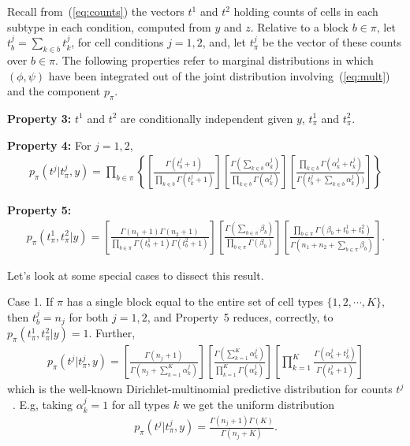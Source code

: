 \documentclass[aoas,preprint]{imsart}
\begin{document}
Recall from~(\ref{eq:counts}) the vectors $t^1$ and $t^2$ holding
counts  of cells in each subtype in each condition, computed from $y$ and $z$.  Relative to a block $b \in \pi$, 
let $t^j_b = \sum_{k\in b} t^j_k$, for cell conditions $j=1,2$, and,
let $t^j_\pi$ be the vector of these counts over $b \in \pi$.   The following properties refer to
marginal distributions in which $(\phi,\psi)$ have been integrated out of the joint
distribution involving~(\ref{eq:mult}) and the component $p_\pi$.

\noindent
{\bf Property 3:}  $t^1$ and $t^2$ are conditionally independent given $y$, $t^1_\pi$ and $t^2_\pi$.

\noindent
{\bf Property 4:}  For $j=1,2$,
\begin{eqnarray*}
p_\pi(t^j | t^j_{\pi},y) = \prod_{b \in \pi} \left\{
\left[ \frac{ \Gamma(t^j_b +1 ) }{\prod_{k \in b} \Gamma( t^j_k + 1 ) } 
\right]
\left[ \frac{\Gamma( \sum_{k \in b} \alpha_k^j )}{
		\prod_{k\in b} \Gamma( \alpha_k^j ) } \right] 
       \left[        \frac{ \prod_{k \in b} \Gamma(\alpha_k^j + t^j_k)  }{
		\Gamma(t^j_b + \sum_{k\in b} \alpha_k^j ) )}\right]
 \right\}
\end{eqnarray*}

\noindent
{\bf Property 5:}  
\begin{eqnarray*}
p_\pi(t^1_{\pi},t^2_{\pi}| y) =
 \left[ \frac{ \Gamma(n_1+1) \Gamma(n_2+1) }{ \prod_{b \in \pi} \Gamma(t^1_b+1) 
   \Gamma( t^2_b + 1 )} \right] 
\left[ \frac{\Gamma( \sum_{b \in \pi} \beta_b  )}{
   \prod_{b \in \pi} \Gamma(\beta_b )} \right] 
 \left[ \frac{ \prod_{b \in \pi} \Gamma( \beta_b + t^1_b + t^2_b )}{
	\Gamma( n_1 + n_2 + \sum_{b \in \pi} \beta_b  )} \right].
\end{eqnarray*}


Let's look at some special cases to dissect this result. 

Case 1. If $\pi$ has a single block equal to the entire
 set of cell types $\{1,2, \cdots, K\}$,  then $t^j_b=n_j$ for both $j=1,2$,
and Property~5 reduces, correctly, to 
$p_\pi(t^1_{\pi},t^2_{\pi}| y) = 1$.  Further,
\begin{eqnarray*}
p_\pi(t^j | t^j_{\pi},y) = 
\left[ \frac{ \Gamma(n_j +1 ) }{ \Gamma( n_j + \sum_{k=1}^K \alpha_k^j ) }
\right]
\left[ \frac{\Gamma( \sum_{k =1}^K \alpha_k^j )}{
                \prod_{k=1}^K \Gamma( \alpha_k^j ) } \right]
       \left[    \prod_{k=1}^K    \frac{  \Gamma(\alpha_k^j + t^j_k)}{
                \Gamma(t^j_k + 1 )}\right]
\end{eqnarray*}
which is the well-known Dirichlet-multinomial predictive distribution
for counts $t^j$~\citep{Wag}.  E.g, taking $\alpha_k^j=1$ for all types $k$ 
we get the uniform distribution
\begin{eqnarray*}
p_\pi(t^j | t^j_{\pi},y) = 
 \frac{ \Gamma(n_j +1 ) \Gamma(K) }{ \Gamma( n_j + K ) }.
\end{eqnarray*}
\end{document}
